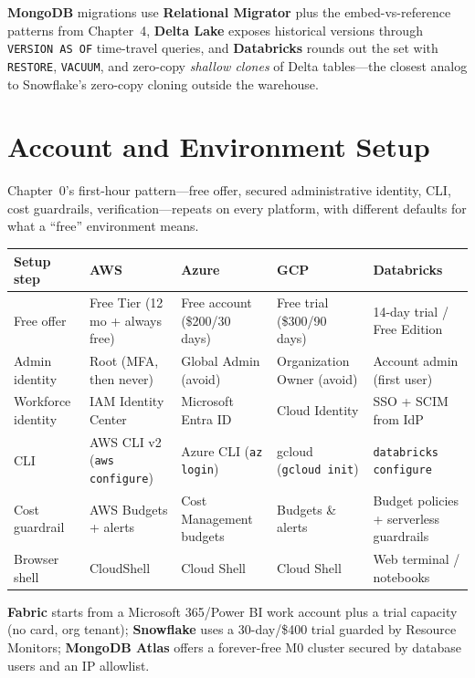 \noindent \textbf{MongoDB} migrations use \textbf{Relational Migrator} plus the embed-vs-reference
patterns from Chapter~4, \textbf{Delta Lake} exposes historical versions through
\texttt{VERSION AS OF} time-travel queries, and \textbf{Databricks} rounds out the set with
\texttt{RESTORE}, \texttt{VACUUM}, and zero-copy \emph{shallow clones} of Delta tables---the
closest analog to Snowflake's zero-copy cloning outside the warehouse.

\section{Account and Environment Setup}
%
Chapter~0's first-hour pattern---free offer, secured administrative identity, CLI, cost
guardrails, verification---repeats on every platform, with different defaults for what a
``free'' environment means.

\begin{center}
\footnotesize
\begin{tabular}{@{}p{2.4cm}p{2.9cm}p{2.9cm}p{2.9cm}p{2.9cm}@{}}
\toprule
\textbf{Setup step} & \textbf{AWS} & \textbf{Azure} & \textbf{GCP} & \textbf{Databricks} \\
\midrule
Free offer & Free Tier (12 mo + always free) & Free account (\$200/30 days) & Free trial (\$300/90 days) & 14-day trial / Free Edition \\
Admin identity & Root (MFA, then never) & Global Admin (avoid) & Organization Owner (avoid) & Account admin (first user) \\
Workforce identity & IAM Identity Center & Microsoft Entra ID & Cloud Identity & SSO + SCIM from IdP \\
CLI & AWS CLI v2 (\texttt{aws configure}) & Azure CLI (\texttt{az login}) & gcloud (\texttt{gcloud init}) & \texttt{databricks configure} \\
Cost guardrail & AWS Budgets + alerts & Cost Management budgets & Budgets \& alerts & Budget policies + serverless guardrails \\
Browser shell & CloudShell & Cloud Shell & Cloud Shell & Web terminal / notebooks \\
\bottomrule
\end{tabular}
\end{center}

\noindent \textbf{Fabric} starts from a Microsoft 365/Power BI work account plus a trial capacity
(no card, org tenant); \textbf{Snowflake} uses a 30-day/\$400 trial guarded by Resource Monitors;
\textbf{MongoDB Atlas} offers a forever-free M0 cluster secured by database users and an IP
allowlist.

